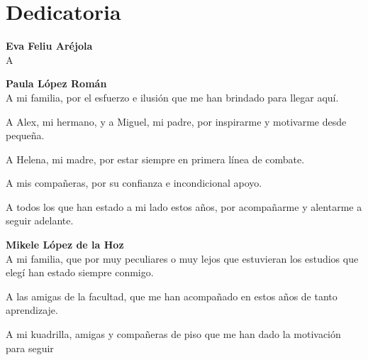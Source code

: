 
\chapter*{Dedicatoria}

\begin{flushright}
    \begin{minipage}{8.5cm}
        \itshape

        \textbf{Eva Feliu Aréjola} \\
        A 

        \vspace{1.5em}

        \textbf{Paula López Román} \\
        A mi familia, por el esfuerzo e ilusión que me han brindado para llegar aquí.

        A Alex, mi hermano, y a Miguel, mi padre, por inspirarme y motivarme desde pequeña. 
        
        A Helena, mi madre, por estar siempre en primera línea de combate.

        A mis compañeras, por su confianza e incondicional apoyo. 

        A todos los que han estado a mi lado estos años, por acompañarme y alentarme a seguir adelante.

        \vspace{1.5em}

        \textbf{Mikele López de la Hoz} \\
        A mi familia, que por muy peculiares o muy lejos que estuvieran los estudios que elegí han estado siempre conmigo. 
        
        A las amigas de la facultad, que me han acompañado en estos años de tanto aprendizaje.
        
        A mi kuadrilla, amigas y compañeras de piso que me han dado la motivación para seguir 
        
    \end{minipage}
\end{flushright}